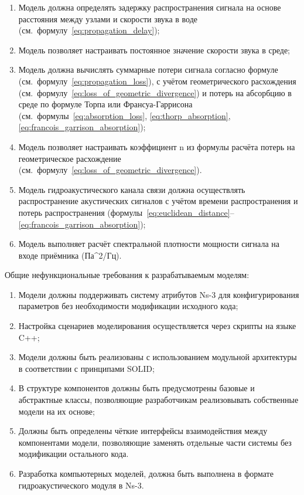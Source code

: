 \documentclass[
    numbers=section,
    document-code={ВКРБ--09.03.04--10.19--XX--26--81}
]{../latex/fqw}
\begin{document}
    \begin{enumerate}
        \def\labelenumi{\arabic{enumi}.}
        \item
        Модель должна определять задержку распространения сигнала на основе
        расстояния между узлами и скорости звука в воде (см.\ формулу~\eqref{eq:propagation_delay});
        \item Модель позволяет настраивать постоянное значение скорости звука в среде;
        \item
        Модель должна вычислять суммарные потери сигнала согласно формуле
        (см.\ формулу~\eqref{eq:propagation_loss}), с учётом геометрического расхождения
        (см.\ формулу~\eqref{eq:loss_of_geometric_divergence}) и потерь на абсорбцию в среде по формуле
        Торпа или Франсуа-Гаррисона
        (см.\ формулы~\eqref{eq:absorption_loss}, \eqref{eq:thorp_absorption}, \eqref{eq:francois_garrison_absorption});
        \item
        Модель позволяет настраивать коэффициент n из формулы расчёта потерь на геометрическое расхождение
        (см.~формулу~\eqref{eq:loss_of_geometric_divergence}).
        \item
        Модель гидроакустического канала связи должна
        осуществлять распространение акустических сигналов с учётом времени распространения и
        потерь распространения (формулы~\eqref{eq:euclidean_distance}--\eqref{eq:francois_garrison_absorption});
        \item Модель выполняет расчёт спектральной плотности мощности сигнала на входе приёмника (Па\^{}2/Гц).
    \end{enumerate}

    Общие нефункциональные требования к разрабатываемым моделям:

    \begin{enumerate}
        \def\labelenumi{\arabic{enumi}.}
        \item
        Модели должны поддерживать систему атрибутов Ns-3
        для конфигурирования параметров без необходимости модификации исходного кода;
        \item Настройка сценариев моделирования осуществляется через скрипты на языке C++;
        \item Модели должны быть реализованы с использованием модульной архитектуры в соответствии с принципами SOLID;
        \item
        В структуре компонентов должны быть предусмотрены базовые и абстрактные классы,
        позволяющие разработчикам реализовывать собственные модели на их основе;
        \item
        Должны быть определены чёткие интерфейсы взаимодействия между компонентами модели,
        позволяющие заменять отдельные части системы без модификации остального кода.
        \item Разработка компьютерных моделей, должна быть выполнена в формате гидроакустического модуля в Ns-3.
    \end{enumerate}
\end{document}
